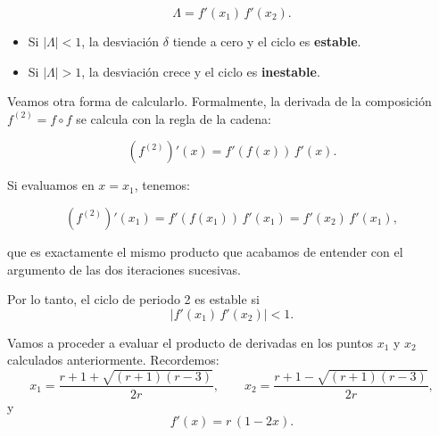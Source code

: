 \documentclass[
  11pt,
  a4paper,
  DIV=11,
  numbers=noendperiod]{scrreprt}
\providecommand{\tightlist}{%
  \setlength{\itemsep}{0pt}\setlength{\parskip}{0pt}}
\begin{document}
\[
\Lambda = f'(x_1)\,f'(x_2).
\]

\begin{itemize}
\tightlist
\item
  Si \(|\Lambda|<1\), la desviación \(\delta\) tiende a cero y el ciclo
  es \textbf{estable}.\\
\item
  Si \(|\Lambda|>1\), la desviación crece y el ciclo es
  \textbf{inestable}.
\end{itemize}

Veamos otra forma de calcularlo. Formalmente, la derivada de la
composición \(f^{(2)}=f\circ f\) se calcula con la regla de la cadena:

\[
(f^{(2)})'(x)
= f'(f(x))\,f'(x).
\]

Si evaluamos en \(x=x_1\), tenemos:

\[
(f^{(2)})'(x_1)
= f'(f(x_1))\,f'(x_1)
= f'(x_2)\,f'(x_1),
\]

que es exactamente el mismo producto que acabamos de entender con el
argumento de las dos iteraciones sucesivas.

Por lo tanto, el ciclo de periodo 2 es estable si\\
\[
\bigl|f'(x_1)\,f'(x_2)\bigr| < 1.
\]

Vamos a proceder a evaluar el producto de derivadas en los puntos
\(x_1\) y \(x_2\) calculados anteriormente. Recordemos: \[
x_1 = \frac{r+1 + \sqrt{(r+1)(r-3)}}{2r},
\qquad
x_2 = \frac{r+1 - \sqrt{(r+1)(r-3)}}{2r},
\] y \[
f'(x) = r\,(1 - 2x).
\]
\end{document}

